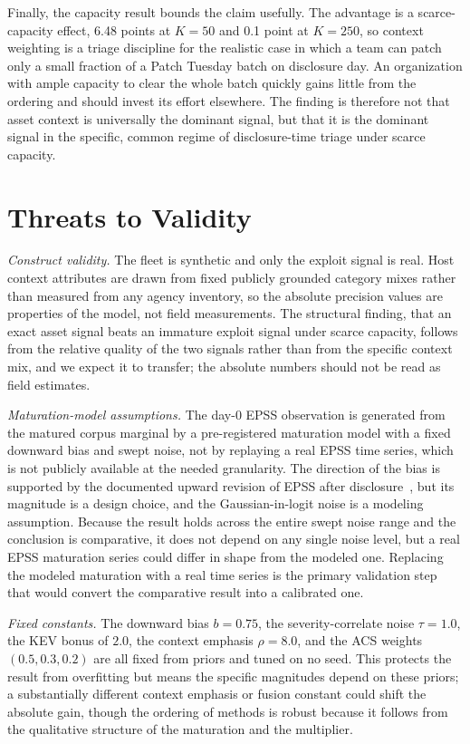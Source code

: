 \documentclass[journal]{IEEEtran}
\begin{document}
Finally, the capacity result bounds the claim usefully. The advantage is a scarce-capacity effect,
6.48 points at $K = 50$ and 0.1 point at $K = 250$, so context weighting is a triage discipline for
the realistic case in which a team can patch only a small fraction of a Patch Tuesday batch on
disclosure day. An organization with ample capacity to clear the whole batch quickly gains little
from the ordering and should invest its effort elsewhere. The finding is therefore not that asset
context is universally the dominant signal, but that it is the dominant signal in the specific,
common regime of disclosure-time triage under scarce capacity.

\section{Threats to Validity}
\emph{Construct validity.} The fleet is synthetic and only the exploit signal is real. Host context
attributes are drawn from fixed publicly grounded category mixes rather than measured from any
agency inventory, so the absolute precision values are properties of the model, not field
measurements. The structural finding, that an exact asset signal beats an immature exploit signal
under scarce capacity, follows from the relative quality of the two signals rather than from the
specific context mix, and we expect it to transfer; the absolute numbers should not be read as field
estimates.

\emph{Maturation-model assumptions.} The day-0 EPSS observation is generated from the matured corpus
marginal by a pre-registered maturation model with a fixed downward bias and swept noise, not by
replaying a real EPSS time series, which is not publicly available at the needed granularity. The
direction of the bias is supported by the documented upward revision of EPSS after
disclosure~\cite{jacobs2023enhancing,firstepss}, but its magnitude is a design choice, and the
Gaussian-in-logit noise is a modeling assumption. Because the result holds across the entire swept
noise range and the conclusion is comparative, it does not depend on any single noise level, but a
real EPSS maturation series could differ in shape from the modeled one. Replacing the modeled
maturation with a real time series is the primary validation step that would convert the comparative
result into a calibrated one.

\emph{Fixed constants.} The downward bias $b = 0.75$, the severity-correlate noise $\tau = 1.0$, the
KEV bonus of $2.0$, the context emphasis $\rho = 8.0$, and the ACS weights $(0.5, 0.3, 0.2)$ are all
fixed from priors and tuned on no seed. This protects the result from overfitting but means the
specific magnitudes depend on these priors; a substantially different context emphasis or fusion
constant could shift the absolute gain, though the ordering of methods is robust because it follows
from the qualitative structure of the maturation and the multiplier.
\end{document}
